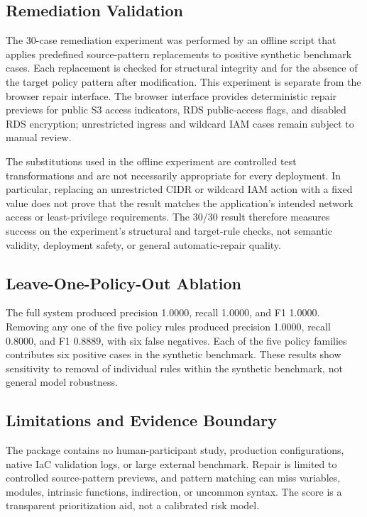 \documentclass[conference]{IEEEtran}
\begin{document}
\subsection{Remediation Validation}
The 30-case remediation experiment was performed by an offline script that applies predefined source-pattern replacements to positive synthetic benchmark cases. Each replacement is checked for structural integrity and for the absence of the target policy pattern after modification. This experiment is separate from the browser repair interface. The browser interface provides deterministic repair previews for public S3 access indicators, RDS public-access flags, and disabled RDS encryption; unrestricted ingress and wildcard IAM cases remain subject to manual review.

The substitutions used in the offline experiment are controlled test transformations and are not necessarily appropriate for every deployment. In particular, replacing an unrestricted CIDR or wildcard IAM action with a fixed value does not prove that the result matches the application's intended network access or least-privilege requirements. The 30/30 result therefore measures success on the experiment's structural and target-rule checks, not semantic validity, deployment safety, or general automatic-repair quality.

\subsection{Leave-One-Policy-Out Ablation}
\begin{samepage}
The full system produced precision 1.0000, recall 1.0000, and F1 1.0000. Removing any one of the five policy rules produced precision 1.0000, recall 0.8000, and F1 0.8889, with six false negatives. Each of the five policy families contributes six positive cases in the synthetic benchmark. These results show sensitivity to removal of individual rules within the synthetic benchmark, not general model robustness.
\end{samepage}

\subsection{Limitations and Evidence Boundary}
The package contains no human-participant study, production configurations, native IaC validation logs, or large external benchmark. Repair is limited to controlled source-pattern previews, and pattern matching can miss variables, modules, intrinsic functions, indirection, or uncommon syntax. The score is a transparent prioritization aid, not a calibrated risk model.
\end{document}
